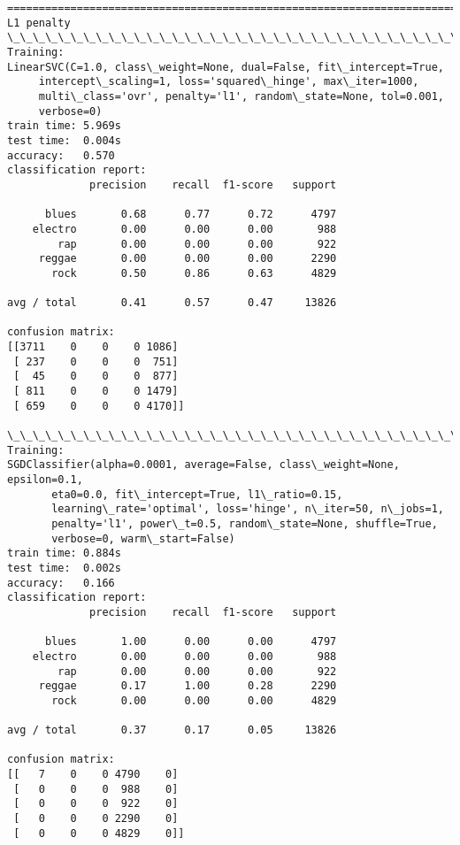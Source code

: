 \documentclass[11pt]{article}
\begin{document}
\begin{Verbatim}[commandchars=\\\{\}]
================================================================================
L1 penalty
\_\_\_\_\_\_\_\_\_\_\_\_\_\_\_\_\_\_\_\_\_\_\_\_\_\_\_\_\_\_\_\_\_\_\_\_\_\_\_\_\_\_\_\_\_\_\_\_\_\_\_\_\_\_\_\_\_\_\_\_\_\_\_\_\_\_\_\_\_\_\_\_\_\_\_\_\_\_\_\_
Training: 
LinearSVC(C=1.0, class\_weight=None, dual=False, fit\_intercept=True,
     intercept\_scaling=1, loss='squared\_hinge', max\_iter=1000,
     multi\_class='ovr', penalty='l1', random\_state=None, tol=0.001,
     verbose=0)
train time: 5.969s
test time:  0.004s
accuracy:   0.570
classification report:
             precision    recall  f1-score   support

      blues       0.68      0.77      0.72      4797
    electro       0.00      0.00      0.00       988
        rap       0.00      0.00      0.00       922
     reggae       0.00      0.00      0.00      2290
       rock       0.50      0.86      0.63      4829

avg / total       0.41      0.57      0.47     13826

confusion matrix:
[[3711    0    0    0 1086]
 [ 237    0    0    0  751]
 [  45    0    0    0  877]
 [ 811    0    0    0 1479]
 [ 659    0    0    0 4170]]

\_\_\_\_\_\_\_\_\_\_\_\_\_\_\_\_\_\_\_\_\_\_\_\_\_\_\_\_\_\_\_\_\_\_\_\_\_\_\_\_\_\_\_\_\_\_\_\_\_\_\_\_\_\_\_\_\_\_\_\_\_\_\_\_\_\_\_\_\_\_\_\_\_\_\_\_\_\_\_\_
Training: 
SGDClassifier(alpha=0.0001, average=False, class\_weight=None, epsilon=0.1,
       eta0=0.0, fit\_intercept=True, l1\_ratio=0.15,
       learning\_rate='optimal', loss='hinge', n\_iter=50, n\_jobs=1,
       penalty='l1', power\_t=0.5, random\_state=None, shuffle=True,
       verbose=0, warm\_start=False)
train time: 0.884s
test time:  0.002s
accuracy:   0.166
classification report:
             precision    recall  f1-score   support

      blues       1.00      0.00      0.00      4797
    electro       0.00      0.00      0.00       988
        rap       0.00      0.00      0.00       922
     reggae       0.17      1.00      0.28      2290
       rock       0.00      0.00      0.00      4829

avg / total       0.37      0.17      0.05     13826

confusion matrix:
[[   7    0    0 4790    0]
 [   0    0    0  988    0]
 [   0    0    0  922    0]
 [   0    0    0 2290    0]
 [   0    0    0 4829    0]]


    \end{Verbatim}
\end{document}
